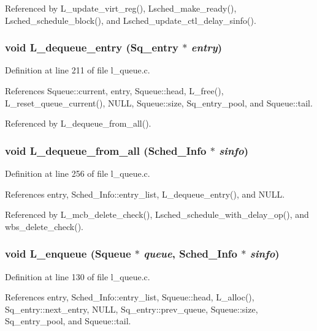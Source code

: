 Referenced by L\_\-update\_\-virt\_\-reg(), Lsched\_\-make\_\-ready(), Lsched\_\-schedule\_\-block(), and Lsched\_\-update\_\-ctl\_\-delay\_\-sinfo().
\subsubsection{\setlength{\rightskip}{0pt plus 5cm}void L\_\-dequeue\_\-entry (\bf{Sq\_\-entry} $\ast$ {\em entry})}\label{l__queue_8c_712aee973c1fce1d5dbb20ed2b28c0da}




Definition at line 211 of file l\_\-queue.c.

References Squeue::current, entry, Squeue::head, L\_\-free(), L\_\-reset\_\-queue\_\-current(), NULL, Squeue::size, Sq\_\-entry\_\-pool, and Squeue::tail.

Referenced by L\_\-dequeue\_\-from\_\-all().
\subsubsection{\setlength{\rightskip}{0pt plus 5cm}void L\_\-dequeue\_\-from\_\-all (\bf{Sched\_\-Info} $\ast$ {\em sinfo})}\label{l__queue_8c_e7af13146ff4d982c5f88e141abe785f}




Definition at line 256 of file l\_\-queue.c.

References entry, Sched\_\-Info::entry\_\-list, L\_\-dequeue\_\-entry(), and NULL.

Referenced by L\_\-mcb\_\-delete\_\-check(), Lsched\_\-schedule\_\-with\_\-delay\_\-op(), and wbs\_\-delete\_\-check().
\subsubsection{\setlength{\rightskip}{0pt plus 5cm}void L\_\-enqueue (\bf{Squeue} $\ast$ {\em queue}, \bf{Sched\_\-Info} $\ast$ {\em sinfo})}\label{l__queue_8c_69f52ba011a108dd2780c616a31a87be}




Definition at line 130 of file l\_\-queue.c.

References entry, Sched\_\-Info::entry\_\-list, Squeue::head, L\_\-alloc(), Sq\_\-entry::next\_\-entry, NULL, Sq\_\-entry::prev\_\-queue, Squeue::size, Sq\_\-entry\_\-pool, and Squeue::tail.

